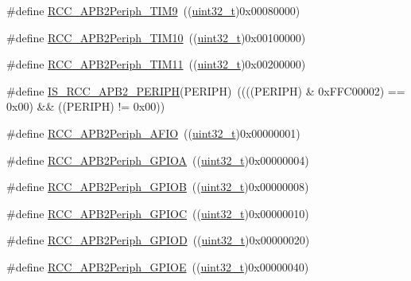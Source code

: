 \begin{DoxyCompactItemize}
\item 
\#define \hyperlink{group___a_p_b2__peripheral_ga24d0145dc172bc27ed580770cf15e4d9}{R\+C\+C\+\_\+\+A\+P\+B2\+Periph\+\_\+\+T\+I\+M9}~((\hyperlink{_p_e___types_8h_a33594304e786b158f3fb30289278f5af}{uint32\+\_\+t})0x00080000)
\item 
\#define \hyperlink{group___a_p_b2__peripheral_ga75069120ecbe86920b39c2b75c909438}{R\+C\+C\+\_\+\+A\+P\+B2\+Periph\+\_\+\+T\+I\+M10}~((\hyperlink{_p_e___types_8h_a33594304e786b158f3fb30289278f5af}{uint32\+\_\+t})0x00100000)
\item 
\#define \hyperlink{group___a_p_b2__peripheral_gaba591104f4e31b1e8ce98c269035850f}{R\+C\+C\+\_\+\+A\+P\+B2\+Periph\+\_\+\+T\+I\+M11}~((\hyperlink{_p_e___types_8h_a33594304e786b158f3fb30289278f5af}{uint32\+\_\+t})0x00200000)
\item 
\#define \hyperlink{group___a_p_b2__peripheral_ga89a2b95e60e90a51b26b53cc4c0e7b14}{I\+S\+\_\+\+R\+C\+C\+\_\+\+A\+P\+B2\+\_\+\+P\+E\+R\+I\+PH}(P\+E\+R\+I\+PH)~((((P\+E\+R\+I\+PH) \& 0x\+F\+F\+C00002) == 0x00) \&\& ((\+P\+E\+R\+I\+P\+H) != 0x00))
\item 
\#define \hyperlink{group___a_p_b2__peripheral_ga5aa9469879ffa019d4836b0d297104c5}{R\+C\+C\+\_\+\+A\+P\+B2\+Periph\+\_\+\+A\+F\+IO}~((\hyperlink{_p_e___types_8h_a33594304e786b158f3fb30289278f5af}{uint32\+\_\+t})0x00000001)
\item 
\#define \hyperlink{group___a_p_b2__peripheral_ga44b92fbf2e288796b1acbce2708f3636}{R\+C\+C\+\_\+\+A\+P\+B2\+Periph\+\_\+\+G\+P\+I\+OA}~((\hyperlink{_p_e___types_8h_a33594304e786b158f3fb30289278f5af}{uint32\+\_\+t})0x00000004)
\item 
\#define \hyperlink{group___a_p_b2__peripheral_ga8c8909c3640508e9ce31dff80010a6dd}{R\+C\+C\+\_\+\+A\+P\+B2\+Periph\+\_\+\+G\+P\+I\+OB}~((\hyperlink{_p_e___types_8h_a33594304e786b158f3fb30289278f5af}{uint32\+\_\+t})0x00000008)
\item 
\#define \hyperlink{group___a_p_b2__peripheral_gaf1f4b467becee1ff31ba2c54328a0115}{R\+C\+C\+\_\+\+A\+P\+B2\+Periph\+\_\+\+G\+P\+I\+OC}~((\hyperlink{_p_e___types_8h_a33594304e786b158f3fb30289278f5af}{uint32\+\_\+t})0x00000010)
\item 
\#define \hyperlink{group___a_p_b2__peripheral_ga177200a365084af306e98389edeba42b}{R\+C\+C\+\_\+\+A\+P\+B2\+Periph\+\_\+\+G\+P\+I\+OD}~((\hyperlink{_p_e___types_8h_a33594304e786b158f3fb30289278f5af}{uint32\+\_\+t})0x00000020)
\item 
\#define \hyperlink{group___a_p_b2__peripheral_gabc736c9892278ccd15848c6137d991fc}{R\+C\+C\+\_\+\+A\+P\+B2\+Periph\+\_\+\+G\+P\+I\+OE}~((\hyperlink{_p_e___types_8h_a33594304e786b158f3fb30289278f5af}{uint32\+\_\+t})0x00000040)

\end{DoxyCompactItemize}
